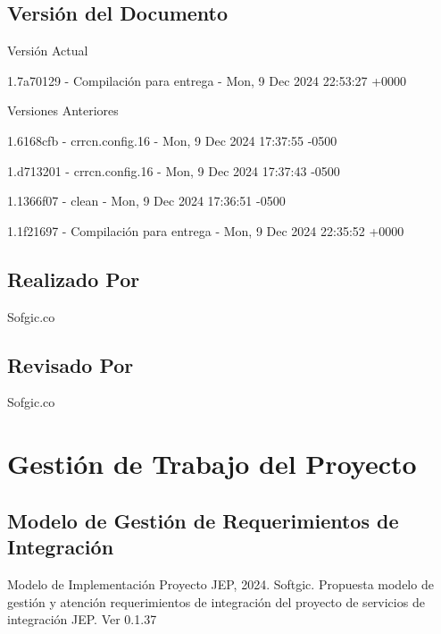 \documentclass[
  paper=a4,
  ,captions=tableheading
]{scrartcl}
\renewenvironment{quote}{\begin{customblockquote}\list{}{\rightmargin=0em\leftmargin=0em}%
\item\relax\color{blockquote-text}\ignorespaces}{\unskip\unskip\endlist\end{customblockquote}}
\begin{document}
\subsection{Versión del Documento}\label{sec:versiuxf3n-del-documento}

\begin{quote}
\end{quote}

Versión Actual

1.7a70129 - Compilación para entrega - Mon, 9 Dec 2024 22:53:27 +0000

Versiones Anteriores

1.6168cfb - crrcn.config.16 - Mon, 9 Dec 2024 17:37:55 -0500

1.d713201 - crrcn.config.16 - Mon, 9 Dec 2024 17:37:43 -0500

1.1366f07 - clean - Mon, 9 Dec 2024 17:36:51 -0500

1.1f21697 - Compilación para entrega - Mon, 9 Dec 2024 22:35:52 +0000

\subsection{Realizado Por}\label{sec:realizado-por}

Sofgic.co

\subsection{Revisado Por}\label{sec:revisado-por}

Sofgic.co

\newpage

\section{Gestión de Trabajo del
Proyecto}\label{sec:gestiuxf3n-de-trabajo-del-proyecto}

\subsection{Modelo de Gestión de Requerimientos de
Integración}\label{sec:modelo-de-gestiuxf3n-de-requerimientos-de-integraciuxf3n}

\begin{quote}
Modelo de Implementación Proyecto JEP, 2024. Softgic. Propuesta modelo
de gestión y atención requerimientos de integración del proyecto de
servicios de integración JEP. Ver 0.1.37
\end{quote}
\end{document}
